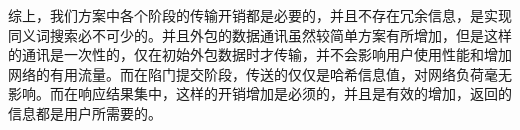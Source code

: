 综上，我们方案中各个阶段的传输开销都是必要的，并且不存在冗余信息，是实现同义词搜索必不可少的。并且外包的数据通讯虽然较简单方案有所增加，但是这样的通讯是一次性的，仅在初始外包数据时才传输，并不会影响用户使用性能和增加网络的有用流量。而在陷门提交阶段，传送的仅仅是哈希信息值，对网络负荷毫无影响。而在响应结果集中，这样的开销增加是必须的，并且是有效的增加，返回的信息都是用户所需要的。

